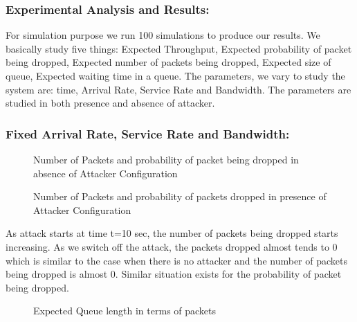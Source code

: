\subsubsection{Experimental Analysis and Results:}
\medskip

For simulation purpose we run 100 simulations to produce our results. We basically study five things: Expected Throughput, Expected probability of packet being dropped, Expected number of packets being dropped, Expected size of queue, Expected waiting time in a queue. The parameters, we vary to study the system are: time, Arrival Rate, Service Rate and Bandwidth. The parameters are studied in both presence and absence of attacker. 
  
\subsubsection*{Fixed Arrival Rate, Service Rate and Bandwidth:}

\begin{figure}[!htb]
	\centering
	\qquad
	\caption{{Number of Packets and probability of packet being dropped in absence of Attacker Configuration}}
	\label{fig:figab}
\end{figure}

\begin{figure}[!htb]
	\centering
	\qquad
	\caption{{Number of Packets and probability of packets dropped in presence of Attacker Configuration}}
	\label{fig:figac}
\end{figure}

As attack starts at time t=10 sec, the number of packets being dropped starts increasing. As we switch off the attack, the packets dropped almost tends to 0 which is similar to the case when there is no attacker and the number of packets being dropped is almost 0. Similar situation exists for the probability of packet being dropped. 

\pagebreak

\begin{figure}[!htb]
	\centering
	\qquad
	\caption{{Expected Queue length in terms of packets}}
	\label{fig:figad}
\end{figure}

